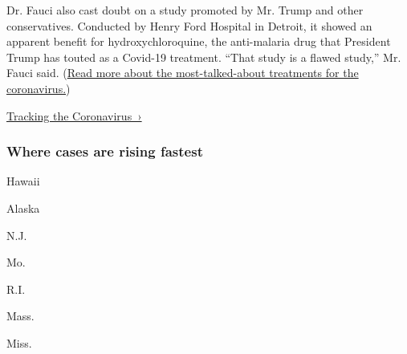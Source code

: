Dr. Fauci also cast doubt on a study promoted by Mr. Trump and other
conservatives. Conducted by Henry Ford Hospital in Detroit, it showed an
apparent benefit for hydroxychloroquine, the anti-malaria drug that
President Trump has touted as a Covid-19 treatment. ``That study is a
flawed study,'' Mr. Fauci said.
(\href{https://www.nytimes3xbfgragh.onion/interactive/2020/science/coronavirus-drugs-treatments.html}{Read
more about the most-talked-about treatments for the coronavirus.})

\href{https://www.nytimes3xbfgragh.onion/interactive/2020/us/coronavirus-us-cases.html}{Tracking
the Coronavirus~›}

\href{https://www.nytimes3xbfgragh.onion/interactive/2020/us/coronavirus-us-cases.html}{}

\hypertarget{where-cases-are-rising-fastest}{%
\subsubsection{\texorpdfstring{Where cases are \textbf{rising}
fastest}{Where cases are rising fastest}}\label{where-cases-are-rising-fastest}}

\href{https://www.nytimes3xbfgragh.onion/interactive/2020/us/hawaii-coronavirus-cases.html}{}

Hawaii

\href{https://www.nytimes3xbfgragh.onion/interactive/2020/us/alaska-coronavirus-cases.html}{}

Alaska

\href{https://www.nytimes3xbfgragh.onion/interactive/2020/us/new-jersey-coronavirus-cases.html}{}

N.J.

\href{https://www.nytimes3xbfgragh.onion/interactive/2020/us/missouri-coronavirus-cases.html}{}

Mo.

\href{https://www.nytimes3xbfgragh.onion/interactive/2020/us/rhode-island-coronavirus-cases.html}{}

R.I.

\href{https://www.nytimes3xbfgragh.onion/interactive/2020/us/massachusetts-coronavirus-cases.html}{}

Mass.

\href{https://www.nytimes3xbfgragh.onion/interactive/2020/us/mississippi-coronavirus-cases.html}{}

Miss.

\href{https://www.nytimes3xbfgragh.onion/interactive/2020/us/maryland-coronavirus-cases.html}{}

